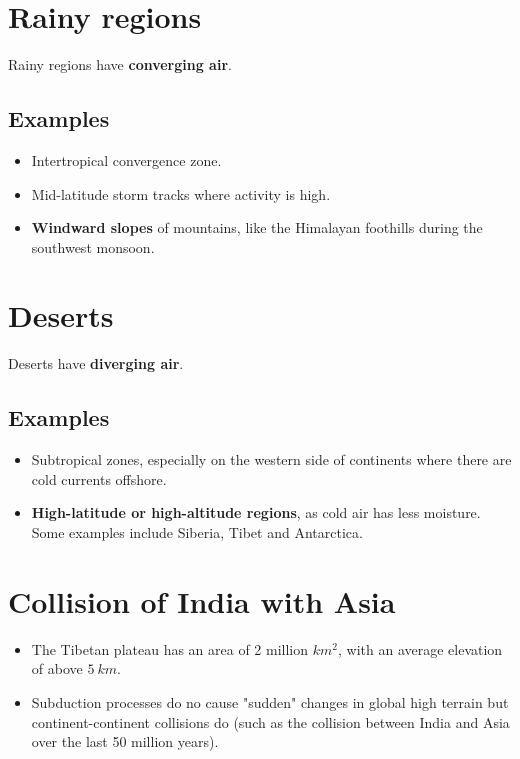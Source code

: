 \documentclass[11pt]{article}
\begin{document}
\section{Rainy regions}
\label{sec:org7c152e1}
Rainy regions have \textbf{converging air}.
\subsection{Examples}
\label{sec:org2de1830}
\begin{itemize}
\item Intertropical convergence zone.
\item Mid-latitude storm tracks where activity is high.
\item \textbf{Windward slopes} of mountains, like the Himalayan foothills during the southwest monsoon.
\end{itemize}
\section{Deserts}
\label{sec:org7abfa9b}
Deserts have \textbf{diverging air}.
\subsection{Examples}
\label{sec:org5a93ce1}
\begin{itemize}
\item Subtropical zones, especially on the western side of continents where there are cold currents offshore.
\item \textbf{High-latitude or high-altitude regions}, as cold air has less moisture. Some examples include Siberia, Tibet and Antarctica.
\end{itemize}
\section{Collision of India with Asia}
\label{sec:org0198378}
\begin{itemize}
\item The Tibetan plateau has an area of 2 million \(\unit{km^{2}}\), with an average elevation of above \(\qty{5}{km}\).
\item Subduction processes do no cause "sudden" changes in global high terrain but continent-continent collisions do (such as the collision between India and Asia over the last 50 million years).
\end{itemize}

\newpage
\end{document}

